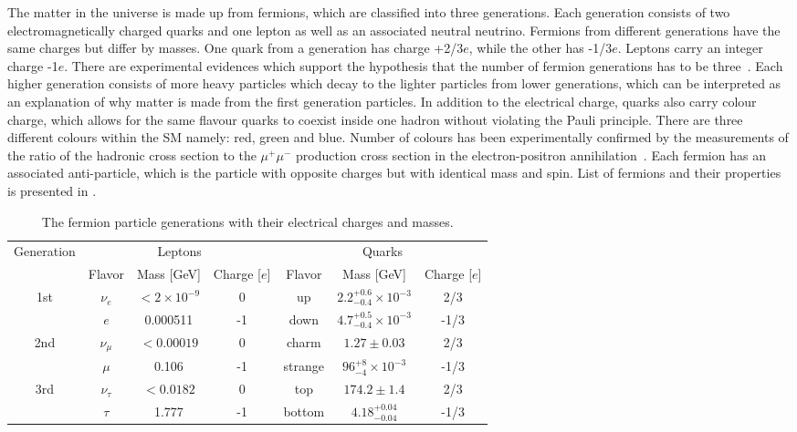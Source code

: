 The matter in the universe is made up from fermions, which are classified into three generations.
Each generation consists of two electromagnetically charged quarks and one lepton as well as an associated neutral neutrino.
Fermions from different generations have the same charges but differ by masses.
One quark from a generation has charge +2/3$e$, while the other has -1/3$e$. Leptons carry an integer charge -1$e$.
There are experimental evidences which support the hypothesis that the number of fermion generations has to be three~\cite{three_lepton_generations}.
Each higher generation consists of more heavy particles which decay to the lighter particles from lower generations, which can be
interpreted as an explanation of why matter is made from the first generation particles.
In addition to the electrical charge, quarks also carry colour charge, 
which allows for the same flavour quarks to coexist inside one hadron without violating the Pauli principle.
There are three different colours within the SM namely: red, green and blue.
Number of colours has been experimentally confirmed by the measurements of the ratio of the hadronic cross section 
to the $\mu^+\mu^-$ production cross section in the electron-positron annihilation~\cite{pdg_2014}. 
Each fermion has an associated anti-particle, which is the particle with opposite charges but with identical mass and spin.
List of fermions and their properties is presented in .

\begin{table*}[!ht]
\begin{center}
\begin{tabular}{c||c|c|c||c|c|c}
\multirow{2}{*}{Generation} & \multicolumn{3}{c||}{Leptons} & \multicolumn{3}{c}{Quarks} \\
\cline{2-7}
 & Flavor & Mass [GeV] & Charge [$e$] &  Flavor & Mass [GeV] & Charge [$e$] \\
\hline
\multirow{2}{*}{1st} & $\nu_e$ & $<2\times10^{-9}$ & 0 & up & $2.2^{+0.6}_{-0.4}\times10^{-3}$ & 2/3 \\
 & $e$ & 0.000511 & -1 & down & $4.7^{+0.5}_{-0.4}\times10^{-3}$ & -1/3 \\
\cline{1-7} 
\multirow{2}{*}{2nd} & $\nu_{\mu}$ & $<0.00019$ & 0 & charm & $1.27\pm0.03$ & 2/3 \\
 & $\mu$ & 0.106 & -1 & strange & $96^{+8}_{-4}\times10^{-3}$ & -1/3 \\
\cline{1-7}
\multirow{2}{*}{3rd} & $\nu_{\tau}$ & $<0.0182$ & 0 & top & $174.2\pm1.4$ & 2/3 \\
 & $\tau$ & 1.777 & -1 & bottom & $4.18^{+0.04}_{-0.04}$ & -1/3 \\
\end{tabular}
\end{center}
 \caption{The fermion particle generations with their electrical charges and masses.}
\label{tab:fermions}
\end{table*}

